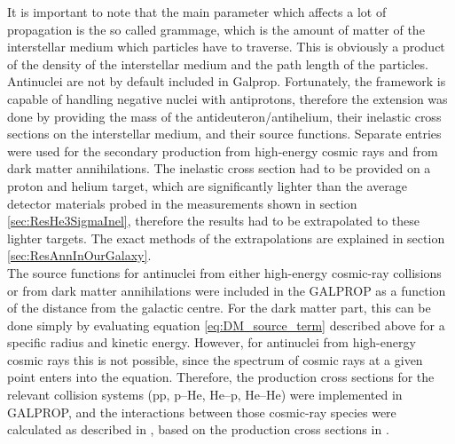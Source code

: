 It is important to note that the main parameter which affects a lot of propagation is the so called grammage, which is the amount of matter of the interstellar medium which particles have to traverse. This is obviously a product of the density of the interstellar medium and the path length of the particles. \\

Antinuclei are not by default included in Galprop. Fortunately, the framework is capable of handling negative nuclei with antiprotons, therefore the extension was done by providing the mass of the antideuteron/antihelium, their inelastic cross sections on the interstellar medium, and their source functions. Separate entries were used for the secondary production from high-energy cosmic rays and from dark matter annihilations. The inelastic cross section had to be provided on a proton and helium target, which are significantly lighter than the average detector materials probed in the measurements shown in section \ref{sec:ResHe3SigmaInel}, therefore the results had to be extrapolated to these lighter targets. The exact methods of the extrapolations are explained in section \ref{sec:ResAnnInOurGalaxy}.\\

The source functions for antinuclei from either high-energy cosmic-ray collisions or from dark matter annihilations were included in the GALPROP as a function of the distance from the galactic centre. For the dark matter part, this can be done simply by evaluating equation \ref{eq:DM_source_term} described above for a specific radius and kinetic energy. However, for antinuclei from high-energy cosmic rays this is not possible, since the spectrum of cosmic rays at a given point enters into the equation. Therefore, the production cross sections for the relevant collision systems (pp, p--He, He--p, He--He) were implemented in GALPROP, and the interactions between those cosmic-ray species were calculated as described in \cite{ALICE-PUBLIC-2022-001}, based on the production cross sections in \cite{}. 

